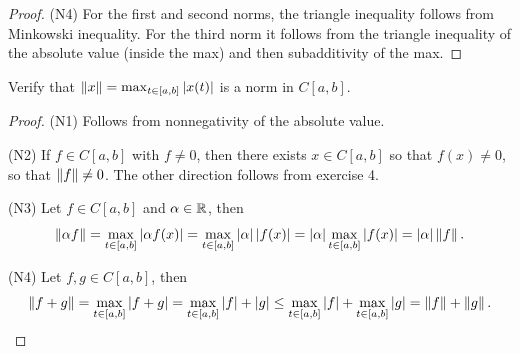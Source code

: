 \begin{proof}
(N4) For the first and second norms, the triangle inequality follows from Minkowski inequality. For the third norm it follows from the triangle inequality of the absolute value (inside the max) and then subadditivity of the max.

\end{proof}

\begin{exercise}{9}
Verify that $\left\lVert x\right\rVert= \max_{t\in [a,b]}\left\lvert x(t)\right\rvert$ is a norm in $C[a,b]$.
\end{exercise}
\begin{proof}
(N1) Follows from nonnegativity of the absolute value.

(N2) If $f\in C[a,b]$ with $f\neq0$, then there exists $x\in C[a,b]$ so that $f(x)\neq 0$, so that $\left\lVert f\right\rVert\neq 0$. The other direction follows from exercise 4.

(N3) Let $f\in C[a,b]$ and $\alpha\in\mathbb{R}$, then 
\[
\left\lVert \alpha f\right\rVert =\max_{t\in [a,b]}\left\lvert \alpha f(x)\right\rvert 
=\max_{t\in [a,b]}\left\lvert \alpha\right\rvert\left\lvert f(x)\right\rvert
=\left\lvert \alpha\right\rvert\max_{t\in [a,b]}\left\lvert f(x)\right\rvert 
=\left\lvert \alpha\right\rvert\left\lVert f\right\rVert.
\]

(N4) Let $f,g\in C[a,b]$, then 
\[
\left\lVert f+g\right\rVert =\max_{t\in [a,b]}\left\lvert f+g\right\rvert 
=\max_{t\in [a,b]}\left\lvert f\right\rvert+\left\lvert g\right\rvert
\leq\max_{t\in [a,b]}\left\lvert f\right\rvert+\max_{t\in [a,b]}\left\lvert g\right\rvert 
=\left\lVert f\right\rVert+\left\lVert g\right\rVert.
\]
\end{proof}


